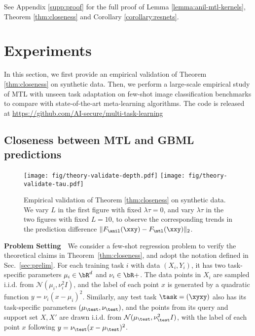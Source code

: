 \documentclass{article}
\begin{document}
See Appendix \ref{supp:proof} for the full proof of Lemma \ref{lemma:anil-mtl-kernels}, Theorem \ref{thm:closeness} and Corollary \ref{corollary:resnets}.

\section{Experiments}
\label{sec:exp}

In this section, we first provide an empirical validation of Theorem \ref{thm:closeness} on synthetic data. Then, we perform a large-scale empirical study of MTL with unseen task adaptation on few-shot image classification benchmarks to compare with state-of-the-art meta-learning algorithms. The code is released at \url{https://github.com/AI-secure/multi-task-learning}
\vspace{-0.5em}
\subsection{Closeness between MTL and GBML predictions}\label{sec:exp:theory-validate}
\begin{figure}[t!]
    \centering
    \hbox{\hspace{+1.25em}\texttt{[image: fig/theory-validate-depth.pdf]}}
    \texttt{[image: fig/theory-validate-tau.pdf]}
    \vspace*{-0.2em}
    \caption{Empirical validation of Theorem \ref{thm:closeness} on synthetic data. We vary $L$ in the first figure with fixed $\lambda \tau = 0$, and vary $\lambda \tau$ in the two figures with fixed $L=10$, to observe the corresponding trends in the prediction difference $\|F_\anil(\xxy) - F_\mtl(\xxy)\|_2$.}\label{fig:thm-validate}
\vspace{-1em}
\end{figure}


\textbf{Problem Setting}~~We consider a few-shot regression problem to verify the theoretical claims in Theorem~\ref{thm:closeness}, and adopt the notation defined in Sec.~\ref{sec:prelim}. For each training task $i$ with data $(X_i,Y_i)$, it has two task-specific parameters $\mu_i\in \bR^d$ and $\nu_i\in \bR+$. The data points in $X_i$ are sampled i.i.d. from $\mathcal{N}(\mu_i,\nu_i^2 I)$, and the label of each point $x$ is generated by a quadratic function $y = \nu_i(x-\mu_i)^2$. Similarly, any test task $\task=(\xyxy)$ also has its task-specific parameters $(\mu_\test,\nu_\test)$, and the points from its query and support set $X,X'$ are drawn i.i.d. from $\mathcal{N}(\mu_\test,\nu_\test^2 I)$, with the label of each point $x$ following $y = \nu_\test(x-\mu_\test)^2$.
\end{document}
